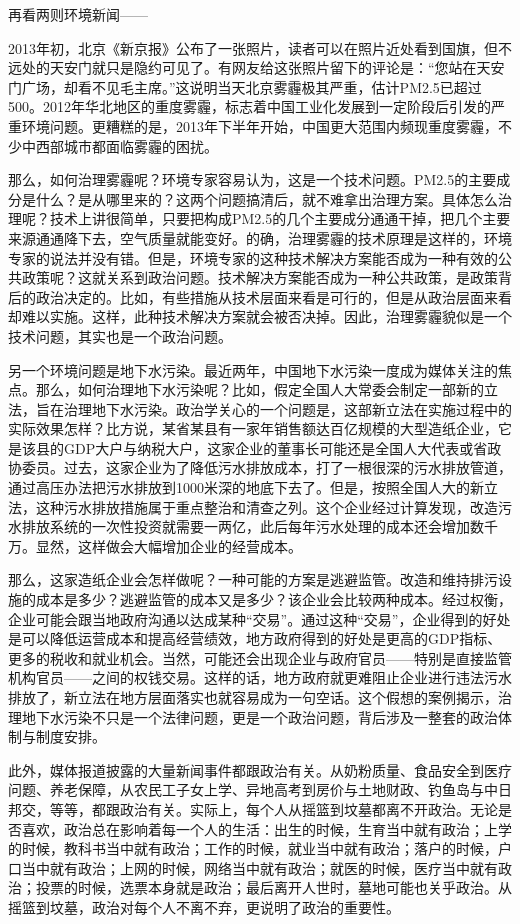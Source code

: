 再看两则环境新闻——

2013年初，北京《新京报》公布了一张照片，读者可以在照片近处看到国旗，但不远处的天安门就只是隐约可见了。有网友给这张照片留下的评论是：“您站在天安门广场，却看不见毛主席。”这说明当天北京雾霾极其严重，估计PM2.5已超过500。2012年华北地区的重度雾霾，标志着中国工业化发展到一定阶段后引发的严重环境问题。更糟糕的是，2013年下半年开始，中国更大范围内频现重度雾霾，不少中西部城市都面临雾霾的困扰。

那么，如何治理雾霾呢？环境专家容易认为，这是一个技术问题。PM2.5的主要成分是什么？是从哪里来的？这两个问题搞清后，就不难拿出治理方案。具体怎么治理呢？技术上讲很简单，只要把构成PM2.5的几个主要成分通通干掉，把几个主要来源通通降下去，空气质量就能变好。的确，治理雾霾的技术原理是这样的，环境专家的说法并没有错。但是，环境专家的这种技术解决方案能否成为一种有效的公共政策呢？这就关系到政治问题。技术解决方案能否成为一种公共政策，是政策背后的政治决定的。比如，有些措施从技术层面来看是可行的，但是从政治层面来看却难以实施。这样，此种技术解决方案就会被否决掉。因此，治理雾霾貌似是一个技术问题，其实也是一个政治问题。

另一个环境问题是地下水污染。最近两年，中国地下水污染一度成为媒体关注的焦点。那么，如何治理地下水污染呢？比如，假定全国人大常委会制定一部新的立法，旨在治理地下水污染。政治学关心的一个问题是，这部新立法在实施过程中的实际效果怎样？比方说，某省某县有一家年销售额达百亿规模的大型造纸企业，它是该县的GDP大户与纳税大户，这家企业的董事长可能还是全国人大代表或省政协委员。过去，这家企业为了降低污水排放成本，打了一根很深的污水排放管道，通过高压办法把污水排放到1000米深的地底下去了。但是，按照全国人大的新立法，这种污水排放措施属于重点整治和清查之列。这个企业经过计算发现，改造污水排放系统的一次性投资就需要一两亿，此后每年污水处理的成本还会增加数千万。显然，这样做会大幅增加企业的经营成本。

那么，这家造纸企业会怎样做呢？一种可能的方案是逃避监管。改造和维持排污设施的成本是多少？逃避监管的成本又是多少？该企业会比较两种成本。经过权衡，企业可能会跟当地政府沟通以达成某种“交易”。通过这种“交易”，企业得到的好处是可以降低运营成本和提高经营绩效，地方政府得到的好处是更高的GDP指标、更多的税收和就业机会。当然，可能还会出现企业与政府官员——特别是直接监管机构官员——之间的权钱交易。这样的话，地方政府就更难阻止企业进行违法污水排放了，新立法在地方层面落实也就容易成为一句空话。这个假想的案例揭示，治理地下水污染不只是一个法律问题，更是一个政治问题，背后涉及一整套的政治体制与制度安排。

此外，媒体报道披露的大量新闻事件都跟政治有关。从奶粉质量、食品安全到医疗问题、养老保障，从农民工子女上学、异地高考到房价与土地财政、钓鱼岛与中日邦交，等等，都跟政治有关。实际上，每个人从摇篮到坟墓都离不开政治。无论是否喜欢，政治总在影响着每一个人的生活：出生的时候，生育当中就有政治；上学的时候，教科书当中就有政治；工作的时候，就业当中就有政治；落户的时候，户口当中就有政治；上网的时候，网络当中就有政治；就医的时候，医疗当中就有政治；投票的时候，选票本身就是政治；最后离开人世时，墓地可能也关乎政治。从摇篮到坟墓，政治对每个人不离不弃，更说明了政治的重要性。

